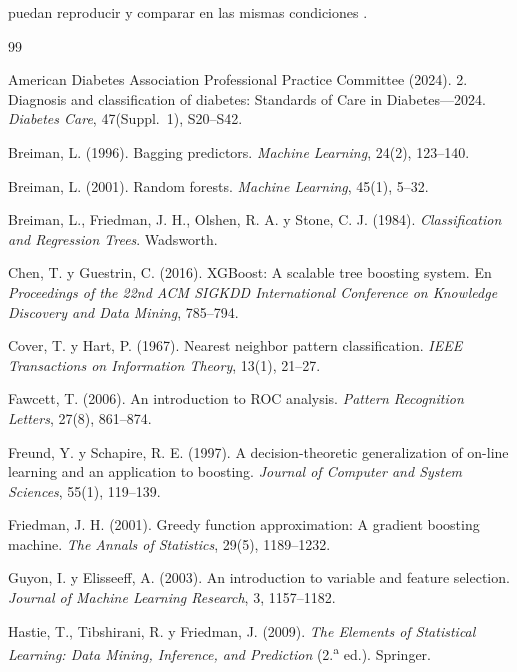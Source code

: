 \documentclass[11pt,a4paper]{article}
\let\citepOriginal\citep
\renewcommand*{\citep}[1]{\textbf{\citepOriginal{#1}}}%
\begin{document}
puedan reproducir y comparar en las mismas condiciones \citep{pedregosa2011}.

\begin{thebibliography}{99}

American Diabetes Association Professional Practice Committee (2024). 2. Diagnosis and classification of diabetes: Standards of Care in Diabetes---2024. \textit{Diabetes Care}, 47(Suppl.~1), S20--S42.

Breiman, L. (1996). Bagging predictors. \textit{Machine Learning}, 24(2), 123--140.

Breiman, L. (2001). Random forests. \textit{Machine Learning}, 45(1), 5--32.

Breiman, L., Friedman, J. H., Olshen, R. A. y Stone, C. J. (1984). \textit{Classification and Regression Trees}. Wadsworth.

Chen, T. y Guestrin, C. (2016). XGBoost: A scalable tree boosting system. En \textit{Proceedings of the 22nd ACM SIGKDD International Conference on Knowledge Discovery and Data Mining}, 785--794.

Cover, T. y Hart, P. (1967). Nearest neighbor pattern classification. \textit{IEEE Transactions on Information Theory}, 13(1), 21--27.

Fawcett, T. (2006). An introduction to ROC analysis. \textit{Pattern Recognition Letters}, 27(8), 861--874.

Freund, Y. y Schapire, R. E. (1997). A decision-theoretic generalization of on-line learning and an application to boosting. \textit{Journal of Computer and System Sciences}, 55(1), 119--139.

Friedman, J. H. (2001). Greedy function approximation: A gradient boosting machine. \textit{The Annals of Statistics}, 29(5), 1189--1232.

Guyon, I. y Elisseeff, A. (2003). An introduction to variable and feature selection. \textit{Journal of Machine Learning Research}, 3, 1157--1182.

Hastie, T., Tibshirani, R. y Friedman, J. (2009). \textit{The Elements of Statistical Learning: Data Mining, Inference, and Prediction} (2.\textsuperscript{a} ed.). Springer.


\end{thebibliography}
\end{document}
